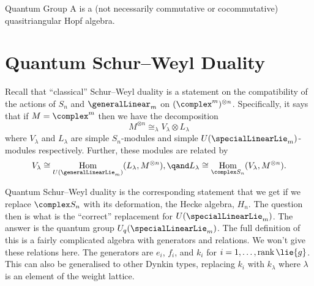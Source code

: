 \documentclass[fleqn]{NotesClass}
\DeclareMathOperator{\Hom}{Hom}
\newcommand{\isomorphic}{\cong}
\begin{document}
    \begin{dfn}{Quantum Group}{}
        A  is a (not necessarily commutative or cocommutative) quasitriangular Hopf algebra.
    \end{dfn}
    
    \section{Quantum Schur--Weyl Duality}
    Recall that \enquote{classical} Schur--Weyl duality is a statement on the compatibility of the actions of \(S_n\) and \(\generalLinear_m\) on \((\complex^m)^{\otimes n}\).
    Specifically, it says that if \(M = \complex^m\) then we have the decomposition
    \begin{equation}
        M^{\otimes n} \isomorphic_\lambda V_\lambda \otimes L_\lambda
    \end{equation}
    where \(V_\lambda\) and \(L_\lambda\) are simple \(S_n\)-modules and simple \(U(\specialLinearLie_m)\)-modules respectively.
    Further, these modules are related by
    \begin{equation}
        V_\lambda \isomorphic \Hom_{U(\generalLinearLie_m)}(L_\lambda, M^{\otimes n}), \qand L_\lambda \isomorphic \Hom_{\complex S_n}(V_\lambda, M^{\otimes n}).
    \end{equation}
    
    Quantum Schur--Weyl duality is the corresponding statement that we get if we replace \(\complex S_n\) with its deformation, the Hecke algebra, \(H_n\).
    The question then is what is the \enquote{correct} replacement for \(U(\specialLinearLie_m)\).
    The answer is the quantum group \(U_q(\specialLinearLie_m)\).
    The full definition of this is a fairly complicated algebra with generators and relations.
    We won't give these relations here.
    The generators are \(e_i\), \(f_i\), and \(k_i\) for \(i = 1, \dotsc, \operatorname{rank}\lie{g}\).
    This can also be generalised to other Dynkin types, replacing \(k_i\) with \(k_\lambda\) where \(\lambda\) is an element of the weight lattice.
    
\end{document}

